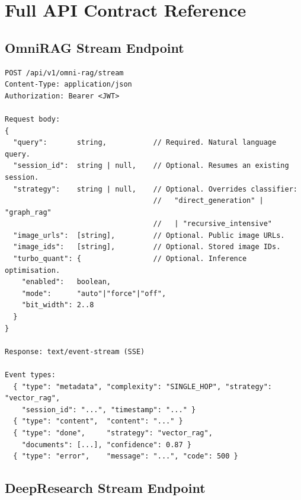 \section{Full API Contract Reference}
\label{sec:api-contract}

\subsection{OmniRAG Stream Endpoint}
\label{sec:stream-api}

\begin{verbatim}
POST /api/v1/omni-rag/stream
Content-Type: application/json
Authorization: Bearer <JWT>

Request body:
{
  "query":       string,           // Required. Natural language query.
  "session_id":  string | null,    // Optional. Resumes an existing session.
  "strategy":    string | null,    // Optional. Overrides classifier:
                                   //   "direct_generation" | "graph_rag"
                                   //   | "recursive_intensive"
  "image_urls":  [string],         // Optional. Public image URLs.
  "image_ids":   [string],         // Optional. Stored image IDs.
  "turbo_quant": {                 // Optional. Inference optimisation.
    "enabled":   boolean,
    "mode":      "auto"|"force"|"off",
    "bit_width": 2..8
  }
}

Response: text/event-stream (SSE)

Event types:
  { "type": "metadata", "complexity": "SINGLE_HOP", "strategy": "vector_rag",
    "session_id": "...", "timestamp": "..." }
  { "type": "content",  "content": "..." }
  { "type": "done",     "strategy": "vector_rag",
    "documents": [...], "confidence": 0.87 }
  { "type": "error",    "message": "...", "code": 500 }
\end{verbatim}

\subsection{DeepResearch Stream Endpoint}
\label{sec:research-api}

